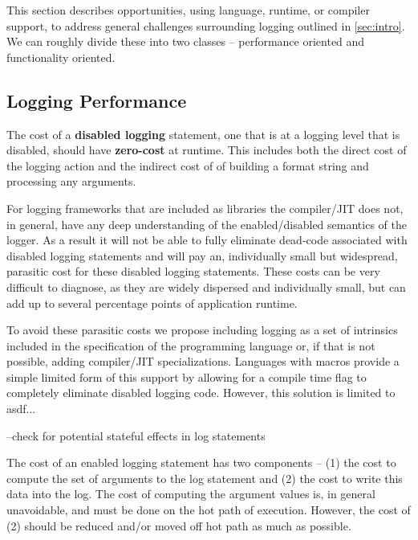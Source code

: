 This section describes opportunities, using language, runtime, or compiler support, to address 
general challenges surrounding logging outlined in \autoref{sec:intro}. We can roughly divide 
these into two classes -- performance oriented and functionality oriented. 

\subsection{Logging Performance}
\label{subsec:performancedesign}

\begin{design}
The cost of a \textbf{disabled logging} statement, one that is at a logging level that is disabled, should 
have \textbf{zero-cost} at runtime. This includes both the direct cost of the logging action and the indirect cost 
of of building a format string and processing any arguments. 
\end{design}
For logging frameworks that are included as libraries the compiler/JIT does not, in general, have any deep understanding 
of the enabled/disabled semantics of the logger. As a result it will not be able to fully eliminate dead-code associated 
with disabled logging statements and will pay an, individually small but widespread, parasitic cost for these disabled logging 
statements. These costs can be very difficult to diagnose, as they are widely dispersed and individually small, but can add 
up to several percentage points of application runtime.

To avoid these parasitic costs we propose including logging as a set of intrinsics included in the specification of the 
programming language or, if that is not possible, adding compiler/JIT specializations. Languages with macros provide a 
simple limited form of this support by allowing for a compile time flag to completely eliminate disabled logging code. However, 
this solution is limited to asdf...


--check for potential stateful effects in log statements

\begin{design}
The cost of an enabled logging statement has two components -- (1) the cost to compute the set of arguments to the 
log statement and (2) the cost to write this data into the log. The cost of computing the argument values is, in general unavoidable, 
and must be done on the hot path of execution. However, the cost of (2) should be reduced and/or moved off hot path as much 
as possible.
\end{design}






